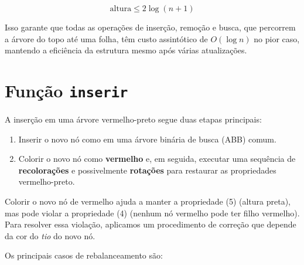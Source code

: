 \[
\text{altura} \leq 2 \log(n + 1)
\]

Isso garante que todas as operações de inserção, remoção e busca, que percorrem a árvore do topo até uma folha, têm custo assintótico de $O(\log n)$ no pior caso, mantendo a eficiência da estrutura mesmo após várias atualizações.

\section{Função {\tt inserir}}

A inserção em uma árvore vermelho-preto segue duas etapas principais:

\begin{enumerate}
    \item Inserir o novo nó como em uma árvore binária de busca (ABB) comum.
    \item Colorir o novo nó como \textbf{vermelho} e, em seguida, executar uma sequência de \textbf{recolorações} e possivelmente \textbf{rotações} para restaurar as propriedades vermelho-preto.
\end{enumerate}

Colorir o novo nó de vermelho ajuda a manter a propriedade (5) (altura preta), mas pode violar a propriedade (4) (nenhum nó vermelho pode ter filho vermelho). Para resolver essa violação, aplicamos um procedimento de correção que depende da cor do \textit{tio} do novo nó.

Os principais casos de rebalanceamento são:

